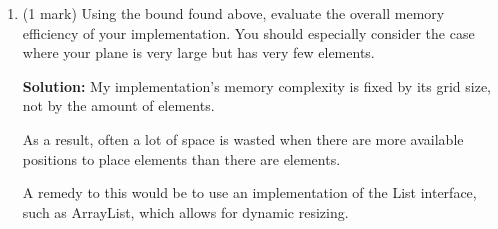 \documentclass[a4,13pt]{extarticle}
\newenvironment{Solution}{\color{blue}\textbf{Solution:}}{}
\begin{document}
\begin{enumerate}
\begin{enumerate}
\begin{Solution}
\begin{itemize}
	      	      	\item \texttt{this.grid} - a 2D array with dimensions $m\times n$
	      	      	\item \texttt{this.minimumX} - The minimum x co-ordinate in which an item can be stored at
	      	      	\item \texttt{this.minimumY} - The minimum y co-ordinate in which an item can be stored at
	      	      	\item \texttt{this.maximumX} - The maximum x co-ordinate in which an item can be stored at
	      	      	\item \texttt{this.maximumY} - The maximum y co-ordinate in which an item can be stored at
	      	      \end{itemize}

In addition to the member variables, the resize() method presents a temporary local variable 'newGrid', whose reference is assigned to this.grid.

In the worst case, this resize()d grid is larger than the original this.grid.

Let 'newGrid' have dimensions $x\times y$, where $x\geq m$, and/or $y\geq n$.

Then, my implementation's memory complexity is bounded by $O(xy)$ (i.e. quadratic complexity).

It is to be noted that other variables such as method parameters, as well as the member variables denoting the maximum and minimum $x$ and $y$ co-ordinates, require a constant amount of memory and as such, can be disregarded by the simplification rules of Big-O notation.
	      	\end{Solution}
	      	      	      	                      
	      	\item (1 mark) Using the bound found above, evaluate the overall memory efficiency of your implementation. 
	      	      You should especially consider the case where your plane is very large but has very few elements.
	      	
	      	\begin{Solution}
My implementation's memory complexity is fixed by its grid size, not by the amount of elements.

As a result, often a lot of space is wasted when there are more available positions to place elements than there are elements.

A remedy to this would be to use an implementation of the List interface, such as ArrayList, which allows for dynamic resizing.


\end{Solution}
\end{enumerate}
\end{enumerate}
\end{document}
